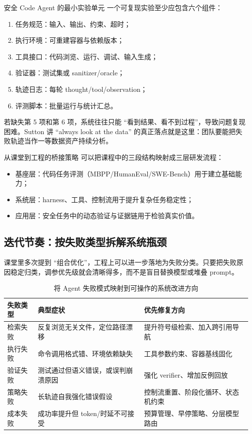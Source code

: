 \documentclass[a4paper]{article}
\begin{document}
\begin{importantbox}{安全 Code Agent 的最小实验单元}
一个可复现实验至少应包含六个组件：
\begin{enumerate}
    \item 任务规范：输入、输出、约束、超时；
    \item 执行环境：可重建容器与依赖版本；
    \item 工具接口：代码浏览、运行、调试、输入生成；
    \item 验证器：测试集或 sanitizer/oracle；
    \item 轨迹日志：每轮 thought/tool/observation；
    \item 评测脚本：批量运行与统计汇总。
\end{enumerate}
\end{importantbox}

若缺失第 5 项和第 6 项，系统往往只能 ``看到结果、看不到过程''，导致问题复现困难。Sutton 讲 ``always look at the data'' 的真正落点就是这里：团队要能把失败轨迹当作一等数据资产持续分析。

\begin{knowledgebox}{从课堂到工程的桥接策略}
可以把课程中的三段结构映射成三层研发流程：
\begin{itemize}
    \item 基座层：代码任务评测（MBPP/HumanEval/SWE-Bench）用于建立基础能力；
    \item 系统层：harness、工具、控制流用于提升复杂任务稳定性；
    \item 应用层：安全任务中的动态验证与证据链用于检验真实价值。
\end{itemize}
\end{knowledgebox}

\subsection{迭代节奏：按失败类型拆解系统瓶颈}
课堂里多次提到 ``组合优化''，工程上可以进一步落地为失败分类。只要把失败原因稳定归类，调参优先级就会清晰得多，而不是盲目替换模型或堆叠 prompt。

\begin{table}[H]
\centering
\begin{tabular}{p{3.2cm}p{4.6cm}p{4.6cm}}
\toprule
\textbf{失败类型} & \textbf{典型症状} & \textbf{优先修复方向} \\
\midrule
检索失败 & 反复浏览无关文件，定位路径漂移 & 提升符号级检索、加入跨引用导航 \\
执行失败 & 命令调用格式错、环境依赖缺失 & 工具参数约束、容器基线固化 \\
验证失败 & 测试通过但语义错误，或误判崩溃原因 & 强化 verifier、增加反例回放 \\
策略失败 & 长轨迹自我强化错误假设 & 控制流重置、阶段化循环、状态机约束 \\
成本失败 & 成功率提升但 token/时延不可接受 & 预算管理、早停策略、分层模型路由 \\
\bottomrule
\end{tabular}
\caption{将 Agent 失败模式映射到可操作的系统改进方向}
\end{table}
\end{document}

